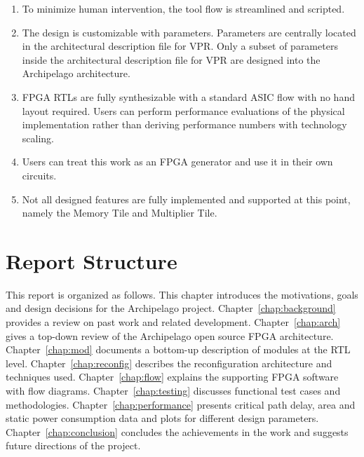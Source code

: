 \begin{enumerate}
	\item To minimize human intervention, the tool flow is streamlined and scripted.
	\item The design is customizable with parameters. Parameters are centrally located in
	the architectural description file for VPR. Only a subset of parameters inside the
	architectural description file for VPR are designed into the Archipelago architecture.
	\item FPGA RTLs are fully synthesizable with a standard ASIC flow with no hand layout required.
	Users can perform performance evaluations of the physical implementation rather than deriving performance
	numbers with technology scaling.
	\item Users can treat this work as an FPGA generator and use it in their own circuits.
	\item Not all designed features are fully implemented and supported at this point, namely the Memory Tile
	and Multiplier Tile. \par
\end{enumerate}

\section{Report Structure}
\label{sec:rpt_struc}
This report is organized as follows. This chapter introduces the motivations, goals and design decisions
for the Archipelago project. Chapter~\ref{chap:background} provides a review on past work and related
development. Chapter~\ref{chap:arch} gives a top-down review of the Archipelago open source FPGA architecture. 
Chapter~\ref{chap:mod} documents a bottom-up description of modules at the RTL level. Chapter~\ref{chap:reconfig}
 describes the reconfiguration architecture and techniques used. Chapter~\ref{chap:flow} explains the supporting
 FPGA software with flow diagrams. Chapter~\ref{chap:testing} discusses functional test cases and methodologies.
Chapter~\ref{chap:performance} presents critical path delay, area and static
power consumption data and plots for different design parameters. 
Chapter~\ref{chap:conclusion} concludes the achievements in the work 
and suggests future directions of the project. \par